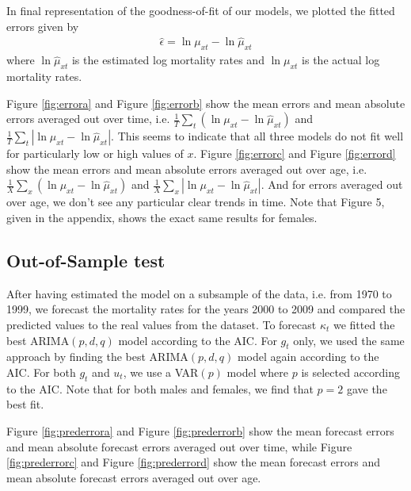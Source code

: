 \documentclass[AER, draftmode]{AEA}
\begin{document}
In final representation of the goodness-of-fit of our models, we plotted the fitted errors given by 
\begin{align}
	\hat{\epsilon} = \ln\mu_{xt}-\ln\hat{\mu}_{xt}
\end{align}
where $\ln\hat{\mu}_{xt}$ is the estimated log mortality rates and $\ln\mu_{xt}$ is the actual log mortality rates.

Figure \ref{fig:errora} and Figure \ref{fig:errorb} show the mean errors and mean absolute errors averaged out over time, i.e. $\frac{1}{T} \sum_t (\ln\mu_{xt}-\ln\hat{\mu}_{xt})$ and $\frac{1}{T} \sum_t |\ln\mu_{xt}-\ln\hat{\mu}_{xt}|$. This seems to indicate that all three models do not fit well for particularly low or high values of $x$.  Figure \ref{fig:errorc} and Figure \ref{fig:errord} show the mean errors and mean absolute errors averaged out over age, i.e. $\frac{1}{X} \sum_x (\ln\mu_{xt}-\ln\hat{\mu}_{xt})$ and $\frac{1}{X} \sum_x |\ln\mu_{xt}-\ln\hat{\mu}_{xt}|$. And for errors averaged out over age, we don't see any particular clear trends in time. Note that Figure 5, given in the appendix, shows the exact same results for females.


\subsection{Out-of-Sample test}

After having estimated the model on a subsample of the data, i.e. from 1970 to 1999, we forecast the mortality rates for the years 2000 to 2009 and compared the predicted values to the real values from the dataset. To forecast $\kappa_t$ we fitted the best ARIMA$(p,d,q)$ model according to the AIC. For $g_t$ only, we used the same approach by finding the best ARIMA$(p,d,q)$ model again according to the AIC. For both $g_t$ and $u_t$, we use a VAR$(p)$ model where $p$ is selected according to the AIC. Note that for both males and females, we find that $p=2$ gave the best fit.

Figure \ref{fig:prederrora} and Figure \ref{fig:prederrorb} show the mean forecast errors and mean absolute forecast errors averaged out over time, while Figure \ref{fig:prederrorc} and Figure \ref{fig:prederrord} show the mean forecast errors and mean absolute forecast errors averaged out over age.
\end{document}
